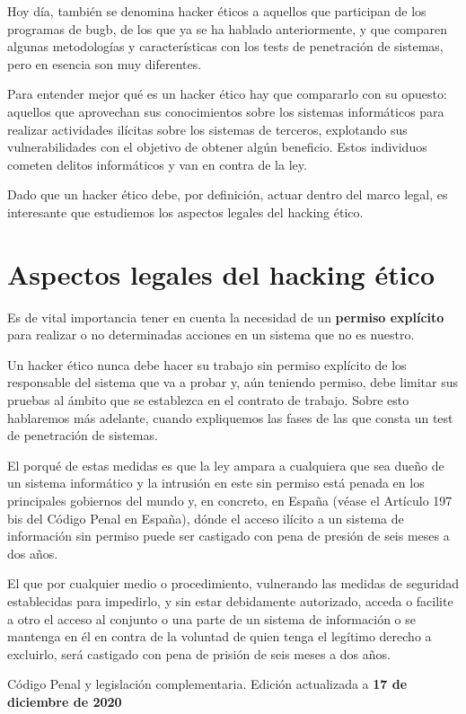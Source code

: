 Hoy día, también se denomina hacker éticos a aquellos que participan de los programas de \gls{bugb}, de los que ya se ha hablado anteriormente, y que comparen algunas metodologías y características con los tests de penetración de sistemas, pero en esencia son muy diferentes.

Para entender mejor qué es un hacker ético hay que compararlo con su opuesto: aquellos que aprovechan sus conocimientos sobre los sistemas informáticos para realizar actividades ilícitas sobre los sistemas de terceros, explotando sus vulnerabilidades con el objetivo de obtener algún beneficio. Estos individuos cometen delitos informáticos y van en contra de la ley. 

Dado que un hacker ético debe, por definición, actuar dentro del marco legal, es interesante que estudiemos los aspectos legales del hacking ético.

\section{Aspectos legales del hacking ético}

Es de vital importancia tener en cuenta la necesidad de un \textbf{permiso explícito} para realizar o no determinadas acciones en un sistema que no es nuestro.

Un hacker ético nunca debe hacer su trabajo sin permiso explícito de los responsable del sistema que va a probar y, aún teniendo permiso, debe limitar sus pruebas al ámbito que se establezca en el contrato de trabajo. Sobre esto hablaremos más adelante, cuando expliquemos las fases de las que consta un test de penetración de sistemas.

El porqué de estas medidas es que la ley ampara a cualquiera que sea dueño de un sistema informático y la intrusión en este sin permiso está penada en los principales gobiernos del mundo y, en concreto, en España (véase el Artículo 197 bis del Código Penal en España), dónde el acceso ilícito a un sistema de información sin permiso puede ser castigado con pena de presión de seis meses a dos años.

\begin{tcolorbox}[coltitle=blue!50!black,colframe=blue!25,title=Artículo 197 bis]
El que por cualquier medio o procedimiento, vulnerando las medidas de seguridad
establecidas para impedirlo, y sin estar debidamente autorizado, acceda o facilite a otro el
acceso al conjunto o una parte de un sistema de información o se mantenga en él en contra
de la voluntad de quien tenga el legítimo derecho a excluirlo, será castigado con pena de
prisión de seis meses a dos años.

\tcblower

Código Penal y legislación complementaria. Edición actualizada a \linebreak \textbf{17 de diciembre de 2020}
\end{tcolorbox}

